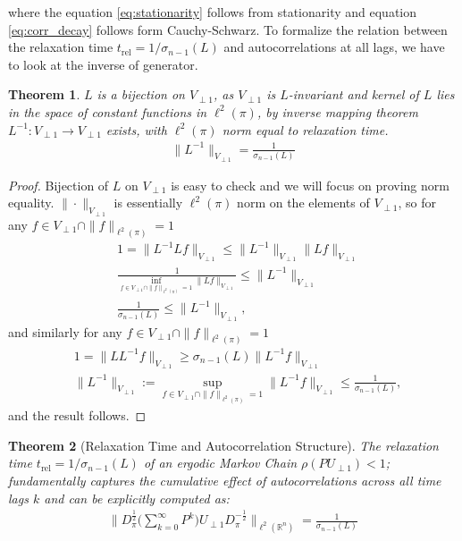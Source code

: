 \documentclass[preprint]{imsart}
\theoremstyle{plain}
\newtheorem{theorem}{Theorem}[section]
\theoremstyle{definition}
\begin{document}
where the equation \eqref{eq:stationarity} follows from stationarity and equation \eqref{eq:corr_decay} follows form Cauchy-Schwarz. To formalize the relation between the relaxation time \(t_{\mathrm{rel}}=1/\sigma_{n-1}(L)\) and autocorrelations at all lags, we have to look at the inverse of generator.
\begin{theorem}
    $L$ is a bijection on $V_{\perp 1}$, as $V_{\perp 1}$ is $L$-invariant and kernel of $L$ lies in the space of constant functions in $\ell^{2}(\pi)$, by inverse mapping theorem $L^{-1}:V_{\perp 1} \rightarrow V_{\perp 1}$ exists, with $\ell^{2}(\pi)$ norm equal to relaxation time.  
    \begin{align}
        \|L^{-1}\|_{V_{\perp 1}}=\frac{1}{\sigma_{n-1}(L)}
    \end{align}
\end{theorem}
\begin{proof}
Bijection of $L$ on $V_{\perp 1}$ is easy to check and we will focus on proving norm equality. $\|\cdot\|_{V_{\perp 1}}$ is essentially $\ell^{2}(\pi)$ norm on the elements of $V_{\perp 1}$, so for any $f \in V_{\perp 1} \cap \|f\|_{\ell^{2}(\pi)}=1$   
\begin{align}
    & \nonumber 1=\|L^{-1}Lf\|_{V_{\perp 1}}\leq \|L^{-1}\|_{V_{\perp 1}}\|Lf\|_{V_{\perp 1}} \\ & \frac{1}{\inf_{f \in V_{\perp 1}\cap \|f\|_{\ell^{2}(\pi)}=1}\|Lf\|_{V_{\perp 1}}} \leq \|L^{-1}\|_{V_{\perp 1}} \\ & \nonumber
    \frac{1}{\sigma_{n-1}(L)} \leq \|L^{-1}\|_{V_{\perp 1}},
\end{align}
and similarly for any $f \in V_{\perp 1}\cap \|f\|_{\ell^{2}(\pi)}=1$
\begin{align}
    & \nonumber 1=\|LL^{-1}f\|_{V_{\perp 1}}\geq \sigma_{n-1}(L) \|L^{-1}f\|_{V_{\perp 1}} \\ & \nonumber \|L^{-1}\|_{V_{\perp 1}}:=\sup_{f \in V_{\perp 1}\cap \|f\|_{\ell^{2}(\pi)}=1}\|L^{-1}f\|_{V_{\perp 1}} \leq \frac{1}{\sigma_{n-1}(L)},
\end{align}
and the result follows.
\end{proof}
\begin{theorem}[Relaxation Time and Autocorrelation Structure]
The relaxation time $t_{\mathrm{rel}} = 1/\sigma_{n-1}(L)$ of an ergodic Markov Chain $\rho(PU_{\perp 1})<1$; fundamentally captures the cumulative effect of autocorrelations across all time lags $k$ and can be explicitly computed as:
   \begin{align}
       \Bigg\|D_{\pi}^{\frac{1}{2}}\Big(\sum_{k=0}^{\infty}P^{k}\Big)U_{\perp 1}D_{\pi}^{-\frac{1}{2}}\Bigg\|_{\ell^{2}(\mathbb{R}^{n})}=\frac{1}{\sigma_{n-1}(L)}
   \end{align}
\end{theorem}
\end{document}
